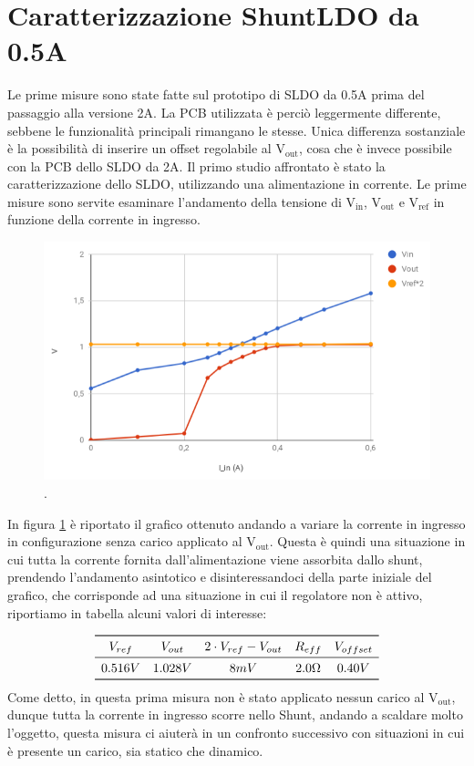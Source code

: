 \section{Caratterizzazione ShuntLDO da 0.5A}
Le prime misure sono state fatte sul prototipo di SLDO da 0.5A prima del passaggio alla versione 2A. La PCB utilizzata è perciò leggermente differente, sebbene le funzionalità principali rimangano le stesse. Unica differenza sostanziale è la possibilità di inserire un offset regolabile al $\mathrm{V_{out}}$, cosa che è invece possibile con la PCB dello SLDO da 2A.
Il primo studio affrontato è stato la caratterizzazione dello SLDO, utilizzando una alimentazione in corrente. Le prime misure sono servite esaminare l'andamento della tensione di $\mathrm{V_{in}}$, $\mathrm{V_{out}}$ e $\mathrm{V_{ref}}$ in funzione della corrente in ingresso.
\begin{figure}
\centering
\includegraphics[scale=.5]{Immagini/provaSLDO5}
\caption{.}
\label{provaSLDO5}
\end{figure}

In figura \ref{provaSLDO5} è riportato il grafico ottenuto andando a variare la corrente in ingresso in configurazione senza carico applicato al $\mathrm{V_{out}}$. Questa è quindi una situazione in cui tutta la corrente fornita dall'alimentazione viene assorbita dallo shunt,  prendendo l'andamento asintotico e disinteressandoci della parte iniziale del grafico, che corrisponde ad una situazione in cui il regolatore non è attivo, riportiamo in tabella alcuni valori di interesse: 

\[
\begin{array}{ccccc}

\toprule
V_{ref} & V_{out} & 2 \cdot V_{ref}- V_{out} & R_{eff} & V_{offset} \\

\midrule

0.516 V & 1.028 V & 8 mV & 2.0 \Omega & 0.40 V \\

\bottomrule
\end{array}
\]
Come detto, in questa prima misura non è stato applicato nessun carico al $\mathrm{V_{out}}$, dunque tutta la corrente in ingresso scorre nello Shunt, andando a scaldare molto l'oggetto, questa misura ci aiuterà in un confronto successivo con situazioni in cui è presente un carico, sia statico che dinamico. 

